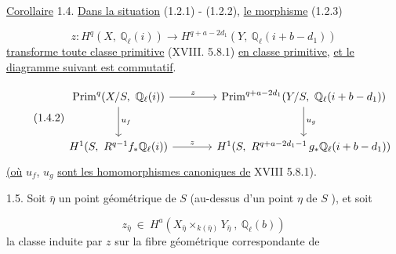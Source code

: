\underline{Corollaire} 1.4.  \underline{Dans la situation} (1.2.1) - (1.2.2), \underline{le morphisme} (1.2.3)

\begin{equation}\tag{1.4.1}
z : H^q(X,\ \mathbb{Q}_\ell(i)) \longrightarrow H^{q+a-2d_1} (Y,\ \mathbb{Q}_\ell(i+b-d_1))
\end{equation}
\underline{transforme toute classe primitive} (XVIII. 5.8.1) \underline{en classe primitive}, \underline{et le diagramme suivant est commutatif}.



\begin{equation}\tag{1.4.2}
\begin{tikzcd}[column sep=large, row sep=large]
\mathrm{Prim}^{q}(X/S,\ \mathbb{Q}_\ell(i)) \arrow[r, "z"] \arrow[d, "u_f"] & \mathrm{Prim}^{q+a-2d_1}(Y/S,\ \mathbb{Q}_\ell(i+b-d_1)) \arrow[d, "u_g"] \\
H^{1}(S,\ R^{q-1}f_*\mathbb{Q}_\ell(i)) \arrow[r, "z"] & H^{1}(S,\ R^{q+a-2d_1-1}\,g_*\mathbb{Q}_\ell(i+b-d_1))
\end{tikzcd}
\end{equation}
\underline{(où} $u_f$, $u_g$ \underline{sont les homomorphismes canoniques de} XVIII 5.8.1).

1.5. Soit $\bar{\eta}$ un point géométrique de $S$ (au-dessus d'un point $\eta$ de $S$ ), et soit

\begin{equation}\tag{1.5.1}
z_{\bar{\eta}} \ \in \ H^{a}(X_{\bar{\eta}} \times_{k(\bar{\eta})} Y_{\bar{\eta}} \ , \ \mathbb{Q}_\ell(b))
\end{equation}
la classe induite par $z$ sur la fibre géométrique correspondante de

